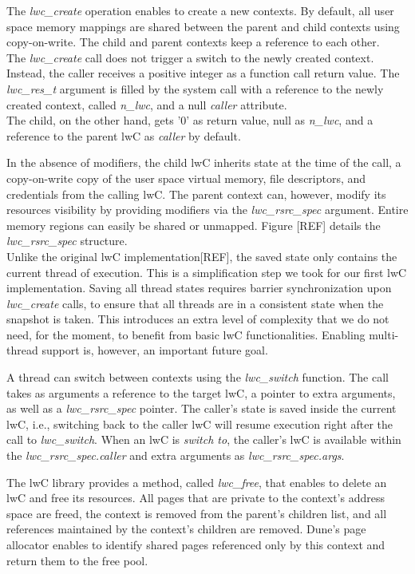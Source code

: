 The \textit{lwc\_create} operation enables to create a new contexts.
By default, all user space memory mappings are shared between the parent and child contexts using copy-on-write.
The child and parent contexts keep a reference to each other.\\
The \emph{lwc\_create} call does not trigger a switch to the newly created context.
Instead, the caller receives a positive integer as a function call return value.
The \emph{lwc\_res\_t} argument is filled by the system call with a reference to the newly created context, called \emph{n\_lwc}, and a null \emph{caller} attribute.\\
The child, on the other hand, gets '0' as return value, null as \emph{n\_lwc}, and a reference to the parent lwC as \emph{caller} by default.

In the absence of modifiers, the child lwC inherits state at the time of the call, a copy-on-write copy of the user space virtual memory, file descriptors, and credentials from the calling lwC.
The parent context can, however, modify its resources visibility by providing modifiers via the \emph{lwc\_rsrc\_spec} argument.
Entire memory regions can easily be shared or unmapped.
Figure [REF] details the \emph{lwc\_rsrc\_spec} structure.\\
Unlike the original lwC implementation[REF], the saved state only contains the current thread of execution.
This is a simplification step we took for our first lwC implementation.
Saving all thread states requires barrier synchronization upon \emph{lwc\_create} calls, to ensure that all threads are in a consistent state when the snapshot is taken.
This introduces an extra level of complexity that we do not need, for the moment, to benefit from basic lwC functionalities.
Enabling multi-thread support is, however, an important future goal.

A thread can switch between contexts using the \emph{lwc\_switch} function.
The call takes as arguments a reference to the target lwC, a pointer to extra arguments, as well as a \emph{lwc\_rsrc\_spec} pointer.
The caller's state is saved inside the current lwC, i.e., switching back to the caller lwC will resume execution right after the call to \emph{lwc\_switch}.
When an lwC is \emph{switch to}, the caller's lwC is available within the \emph{lwc\_rsrc\_spec.caller} and extra arguments as \emph{lwc\_rsrc\_spec.args}.

The lwC library provides a method, called \emph{lwc\_free}, that enables to delete an lwC and free its resources.
All pages that are private to the context's address space are freed, the context is removed from the parent's children list, and all references maintained by the context's children are removed.
Dune's page allocator enables to identify shared pages referenced only by this context and return them to the free pool.


